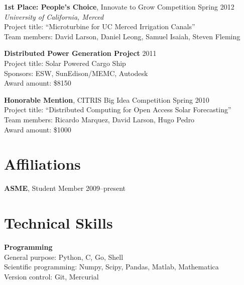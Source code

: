 \documentclass[]{res}
\begin{document}
\begin{resume}
\textbf{1st Place: People's Choice}, Innovate to Grow Competition \hfill Spring 2012 \\
\textit{University of California, Merced} \\
Project title: ``Microturbine for UC Merced Irrigation Canals'' \\
Team members: David Larson, Daniel Leong, Samuel Isaiah, Steven Fleming

\textbf{Distributed Power Generation Project} \hfill 2011 \\
Project title: Solar Powered Cargo Ship \\
Sponsors: ESW, SunEdison/MEMC, Autodesk \\
Award amount: \$8150

\textbf{Honorable Mention}, CITRIS Big Idea Competition \hfill Spring 2010 \\
Project title: ``Distributed Computing for Open Access Solar Forecasting'' \\
Team members: Ricardo Marquez, David Larson, Hugo Pedro \\
Award amount: \$1000



\section{Affiliations}
\vspace{0.1in}

\textbf{ASME}, Student Member \hfill 2009--present


\section{Technical Skills}
\vspace{0.1in}

\textbf{Programming} \\
General purpose: Python, C, Go, Shell \\
Scientific programming: Numpy, Scipy, Pandas, Matlab, Mathematica \\
Version control: Git, Mercurial


\end{resume}
\end{document}

